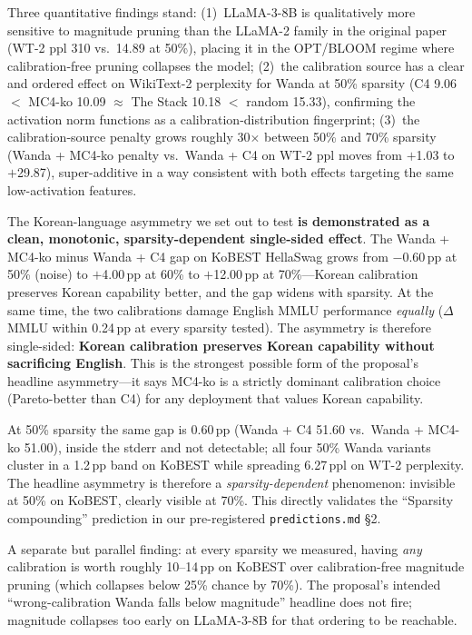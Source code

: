 \documentclass{article}
\begin{document}
Three quantitative findings stand:
(1)~LLaMA-3-8B is qualitatively more sensitive to magnitude pruning than
the LLaMA-2 family in the original paper (WT-2 ppl 310 vs.\ 14.89 at
50\%), placing it in the OPT/BLOOM regime where calibration-free pruning
collapses the model;
(2)~the calibration source has a clear and ordered effect on WikiText-2
perplexity for Wanda at 50\% sparsity (C4 9.06 $<$ MC4-ko 10.09
$\approx$ The Stack 10.18 $<$ random 15.33), confirming the activation
norm functions as a calibration-distribution fingerprint;
(3)~the calibration-source penalty grows roughly 30$\times$ between 50\%
and 70\% sparsity (Wanda + MC4-ko penalty vs.\ Wanda + C4 on WT-2 ppl
moves from $+$1.03 to $+$29.87), super-additive in a way consistent with
both effects targeting the same low-activation features.

The Korean-language asymmetry we set out to test
\textbf{is demonstrated as a clean, monotonic, sparsity-dependent
single-sided effect}. The Wanda + MC4-ko minus Wanda + C4 gap on KoBEST
HellaSwag grows from $-$0.60\,pp at 50\% (noise) to $+$4.00\,pp at 60\%
to $+$12.00\,pp at 70\%---Korean calibration preserves Korean capability
better, and the gap widens with sparsity. At the same time, the two
calibrations damage English MMLU performance \emph{equally}
($\Delta$MMLU within 0.24\,pp at every sparsity tested). The asymmetry
is therefore single-sided: \textbf{Korean calibration preserves Korean
capability without sacrificing English}. This is the strongest possible
form of the proposal's headline asymmetry---it says MC4-ko is a
strictly dominant calibration choice (Pareto-better than C4) for any
deployment that values Korean capability.

At 50\% sparsity the same gap is 0.60\,pp (Wanda + C4 51.60 vs.\ Wanda +
MC4-ko 51.00), inside the stderr and not detectable; all four 50\%
Wanda variants cluster in a 1.2\,pp band on KoBEST while spreading
6.27\,ppl on WT-2 perplexity. The headline asymmetry is therefore a
\emph{sparsity-dependent} phenomenon: invisible at 50\% on KoBEST,
clearly visible at 70\%. This directly validates the
``Sparsity compounding'' prediction in our pre-registered
\texttt{predictions.md} \S2.

A separate but parallel finding: at every sparsity we measured, having
\emph{any} calibration is worth roughly 10--14\,pp on KoBEST over
calibration-free magnitude pruning (which collapses below 25\% chance
by 70\%). The proposal's intended ``wrong-calibration Wanda falls
below magnitude'' headline does not fire; magnitude collapses too
early on LLaMA-3-8B for that ordering to be reachable.
\end{document}
